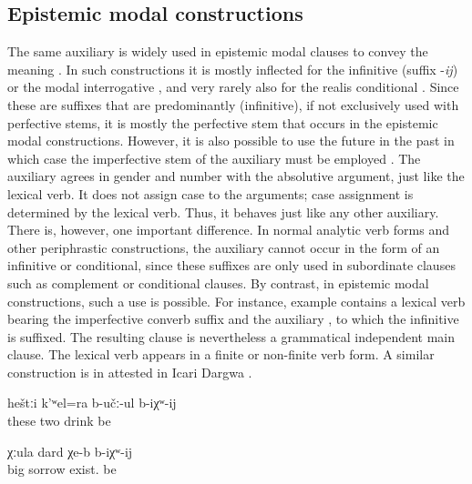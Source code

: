 \subsection{Epistemic modal constructions}
\label{ssec:Epistemic modal constructions}

The same auxiliary is widely used in epistemic modal clauses to convey the meaning . In such constructions it is mostly inflected for the infinitive (suffix -\textit{ij})  or the modal interrogative  , and very rarely also for the realis conditional  . Since these are suffixes that are predominantly (infinitive), if not exclusively used with perfective stems, it is mostly the perfective stem  that occurs in the epistemic modal constructions. However, it is also possible to use the future in the past in which case the imperfective stem of the auxiliary must be employed . The auxiliary agrees in gender and number with the absolutive argument, just like the lexical verb. It does not assign case to the arguments; case assignment is determined by the lexical verb. Thus, it behaves just like any other auxiliary. There is, however, one important difference. In normal analytic verb forms and other periphrastic constructions, the auxiliary cannot occur in the form of an infinitive or conditional, since these suffixes are only used in subordinate clauses such as complement or conditional clauses. By contrast, in epistemic modal constructions, such a use is possible. For instance, example  contains a lexical verb bearing the imperfective converb suffix and the auxiliary , to which the infinitive is suffixed. The resulting clause is nevertheless a grammatical independent main clause. The lexical verb appears in a finite or non-finite verb form. A similar construction is in attested in Icari Dargwa \citep[110]{Sumbatova.Mutalov2003}.
%
\begin{exe}
	\ex	\label{ex:These two are probably drinking}
	\gll	heštːi	k'ʷel=ra	b-učː-ul	b-iχʷ-ij\\
		these	two	drink	be\\
	\glt	{}

	\ex	\label{ex:(He) probably has big sorrows}
	\gll	χːula	dard	χe-b	b-iχʷ-ij\\
		big	sorrow	exist.		be\\
	\glt	{}
\end{exe}


